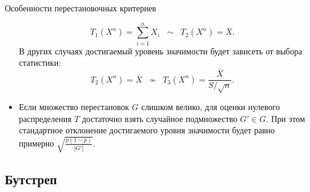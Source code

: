 \documentclass[11pt,pdf,utf8,hyperref={unicode},aspectratio=169]{beamer}
\begin{document}
\begin{frame}{Особенности перестановочных критериев}
\begin{itemize}
 $$T_1\left(X^n\right) = \sum\limits_{i=1}^n X_i \;\;\sim \;\; T_2\left(X^n\right) = \bar{X}.$$
 В других случаях достигаемый уровень значимости будет зависеть от выбора статистики:
 $$T_2\left(X^n\right) = \bar{X} \;\; \nsim \;\; T_3\left(X^n\right) = \frac{\bar{X}}{S/\sqrt{n}}.$$
 \item Если множество перестановок $G$ слишком велико, для оценки нулевого распределения $T$ достаточно взять случайное подмножество $G'\in G.$ При этом стандартное отклонение достигаемого уровня значимости будет равно примерно $\sqrt{\frac{p\left(1-p\right)}{\left|G'\right|}}.$
 \end{itemize}
\end{frame}

\subsection{Бутстреп}
\end{document}
